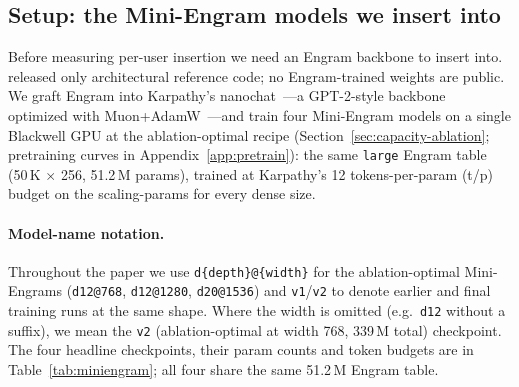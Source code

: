 \documentclass[11pt]{article}
\begin{document}
\subsection{Setup: the Mini-Engram models we insert into}
\label{sec:repro}

Before measuring per-user insertion we need an Engram backbone to
insert into. \citet{cheng2026engram} released only architectural reference
code; no Engram-trained weights are public. We graft Engram into
Karpathy's nanochat~\citep{karpathy2026nanochat}---a GPT-2-style
backbone~\citep{radford2019gpt2} optimized with
Muon+AdamW~\citep{jordan2024muon}---and train four Mini-Engram
models on a single Blackwell GPU at the ablation-optimal recipe
(Section~\ref{sec:capacity-ablation}; pretraining curves in
Appendix~\ref{app:pretrain}): the same \texttt{large}
Engram table (50\,K $\times$ 256, 51.2\,M params), trained at
Karpathy's 12 tokens-per-param (t/p) budget on the scaling-params
for every dense size.

\paragraph{Model-name notation.} Throughout the paper we use
\texttt{d\{depth\}@\{width\}} for the ablation-optimal Mini-Engrams
(\texttt{d12@768}, \texttt{d12@1280}, \texttt{d20@1536}) and
\texttt{v1}/\texttt{v2} to denote earlier and final training runs
at the same shape. Where the width is omitted (e.g.\ \texttt{d12}
without a suffix), we mean the \texttt{v2} (ablation-optimal at
width 768, 339\,M total) checkpoint. The four headline checkpoints,
their param counts and token budgets are in
Table~\ref{tab:miniengram}; all four share the same 51.2\,M Engram
table.
\end{document}
